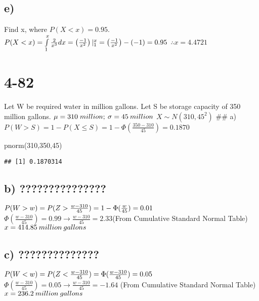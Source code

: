 \documentclass[
]{article}
\newenvironment{Shaded}{\begin{snugshade}}{\end{snugshade}}
\newcommand{\DecValTok}[1]{\textcolor[rgb]{0.00,0.00,0.81}{#1}}
\newcommand{\FunctionTok}[1]{\textcolor[rgb]{0.00,0.00,0.00}{#1}}
\newcommand{\NormalTok}[1]{#1}
\begin{document}
\hypertarget{e}{%
\subsection{e)}\label{e}}

Find x, where \(P(X<x)=0.95\).
\(\\P(X<x) = \int\limits_{1}^{x}\frac{2}{x^3} dx = \left(\frac{-1}{x^2}\right)|_{1}^{x} = \left(\frac{-1}{x^2}\right)- (-1)= 0.95\\\)
\(\therefore x = 4.4721\)

\hypertarget{section-3}{%
\section{4-82}\label{section-3}}

Let W be required water in million gallons. Let S be storage capacity of
350 million gallons. \(\mu = 310\; million;\:\sigma = 45\: million\\\)
\(X\sim N(310,45^2)\) \#\# a)
\(P(W>S)=1-P(X\le S) = 1 - \Phi(\frac{350-310}{45}) = 0.1870\)

\begin{Shaded}
\begin{Highlighting}[]
\FunctionTok{pnorm}\NormalTok{(}\DecValTok{310}\NormalTok{,}\DecValTok{350}\NormalTok{,}\DecValTok{45}\NormalTok{)}
\end{Highlighting}
\end{Shaded}

\begin{verbatim}
## [1] 0.1870314
\end{verbatim}

\hypertarget{b-3}{%
\subsection{b) ???????????????}\label{b-3}}

\(P(W>w) = P(Z>\frac{w-310}{45}) = 1 - \Phi(\frac{w}{45}) = 0.01\\\)
\(\Phi(\frac{w-310}{45}) = 0.99 \rightarrow \frac{w-310}{45} = 2.33\)(From
Cumulative Standard Normal Table) \(\\x =414.85\: million\:gallons\)

\hypertarget{c-2}{%
\subsection{c) ??????????????}\label{c-2}}

\(P(W<w) = P(Z<\frac{w-310}{45}) = \Phi(\frac{w-310}{45}) = 0.05\\\)
\(\Phi(\frac{w-310}{45}) = 0.05 \rightarrow \frac{w-310}{45} = -1.64\)
(From Cumulative Standard Normal Table)
\(\\x =236.2\: million\:gallons\)
\end{document}
